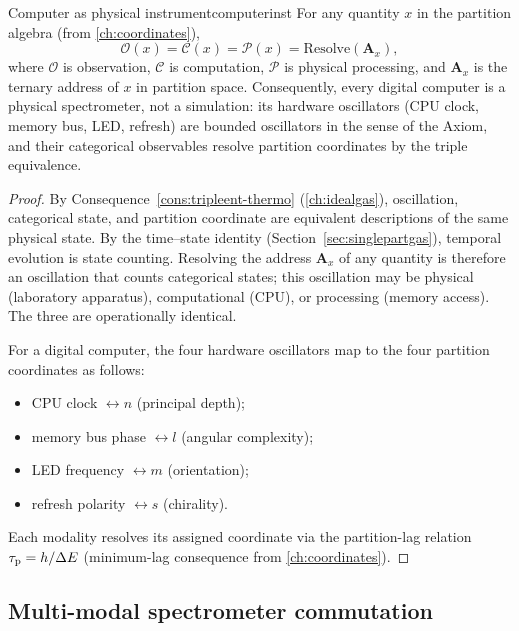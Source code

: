 \begin{consequence}{Computer as physical instrument}{computerinst}
For any quantity $x$ in the partition algebra (from \cref{ch:coordinates}),
\begin{equation}
  \mathcal{O}(x)
  = \mathcal{C}(x)
  = \mathcal{P}(x)
  = \mathrm{Resolve}(\mathbf{A}_x),
  \label{eq:OCP}
\end{equation}
where $\mathcal{O}$ is observation, $\mathcal{C}$ is computation,
$\mathcal{P}$ is physical processing, and $\mathbf{A}_x$ is the ternary
address of $x$ in partition space.  Consequently, every digital computer
is a physical spectrometer, not a simulation: its hardware oscillators
(CPU clock, memory bus, LED, refresh) are bounded oscillators in the
sense of the Axiom, and their categorical observables resolve partition
coordinates by the triple equivalence.
\end{consequence}

\begin{proof}
By Consequence~\ref{cons:tripleent-thermo} (\cref{ch:idealgas}), oscillation,
categorical state, and partition coordinate are equivalent descriptions of
the same physical state.  By the time--state identity
(Section~\ref{sec:singlepartgas}), temporal evolution is state counting.
Resolving the address $\mathbf{A}_x$ of any quantity is therefore an
oscillation that counts categorical states; this oscillation may be
physical (laboratory apparatus), computational (CPU), or processing
(memory access).  The three are operationally identical.

\medskip
For a digital computer, the four hardware oscillators map to the four
partition coordinates as follows:
\begin{itemize}[nosep]
  \item CPU clock $\leftrightarrow n$ (principal depth);
  \item memory bus phase $\leftrightarrow l$ (angular complexity);
  \item LED frequency $\leftrightarrow m$ (orientation);
  \item refresh polarity $\leftrightarrow s$ (chirality).
\end{itemize}
Each modality resolves its assigned coordinate via the partition-lag
relation $\tau_{\mathrm{p}} = h/\Delta E$ (minimum-lag consequence from
\cref{ch:coordinates}).
\end{proof}

\subsection{Multi-modal spectrometer commutation}

